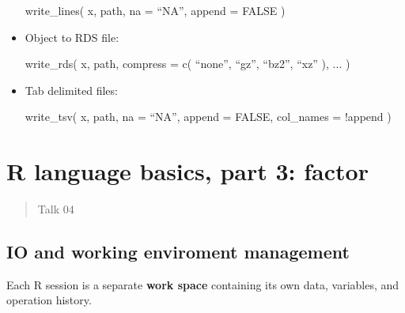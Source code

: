 \documentclass[
]{article}
\newenvironment{Shaded}{}{}
\newcommand{\AttributeTok}[1]{\textcolor[rgb]{0.49,0.56,0.16}{#1}}
\newcommand{\ConstantTok}[1]{\textcolor[rgb]{0.53,0.00,0.00}{#1}}
\newcommand{\FunctionTok}[1]{\textcolor[rgb]{0.02,0.16,0.49}{#1}}
\newcommand{\NormalTok}[1]{#1}
\newcommand{\SpecialCharTok}[1]{\textcolor[rgb]{0.25,0.44,0.63}{#1}}
\begin{document}
\begin{itemize}
\begin{Shaded}
\begin{Highlighting}[]
\FunctionTok{write\_lines}\NormalTok{(}
\NormalTok{  x,}
\NormalTok{  path,}
  \AttributeTok{na =}\NormalTok{ “NA”, }
  \AttributeTok{append =} \ConstantTok{FALSE}
\NormalTok{) }
\end{Highlighting}
\end{Shaded}
\item
  Object to RDS file:

\begin{Shaded}
\begin{Highlighting}[]
\FunctionTok{write\_rds}\NormalTok{(}
\NormalTok{  x,}
\NormalTok{  path, }
  \AttributeTok{compress =} 
  	\FunctionTok{c}\NormalTok{(}
\NormalTok{      “none”,}
\NormalTok{      “gz”,}
\NormalTok{      “bz2”,}
\NormalTok{      “xz”}
\NormalTok{    ),}
\NormalTok{  ...}
\NormalTok{)}
\end{Highlighting}
\end{Shaded}
\item
  Tab delimited files:

\begin{Shaded}
\begin{Highlighting}[]
\FunctionTok{write\_tsv}\NormalTok{(}
\NormalTok{  x, }
\NormalTok{  path, }
  \AttributeTok{na =}\NormalTok{ “NA”, }
  \AttributeTok{append =} \ConstantTok{FALSE}\NormalTok{, }
  \AttributeTok{col\_names =} \SpecialCharTok{!}\NormalTok{append}
\NormalTok{)}
\end{Highlighting}
\end{Shaded}
\end{itemize}

\newpage
\hypertarget{r-language-basics-part-3-factor}{%
\section{R language basics, part 3:
factor}\label{r-language-basics-part-3-factor}}

\begin{quote}
Talk 04
\end{quote}

\hypertarget{io-and-working-enviroment-management}{%
\subsection{IO and working enviroment
management}\label{io-and-working-enviroment-management}}

Each R session is a separate \textbf{work space} containing its own
data, variables, and operation history.
\end{document}
